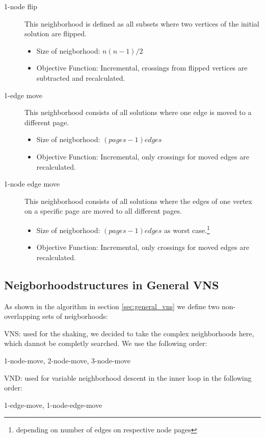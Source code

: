 \documentclass{scrartcl}
\begin{document}
\begin{description}
\item[1-node flip] 
    
    This neighborhood is defined as all subsets where two vertices of the initial solution are flipped.
    \begin{itemize}
        \item Size of neigborhood: $n(n-1)/2$
        \item Objective Function: Incremental, crossings from flipped vertices are subtracted and recalculated.

    \end{itemize}

	
\item[1-edge move] This neighborhood consists of all solutions where one edge is moved to a different page. 
     \begin{itemize}
        \item Size of neigborhood: $(pages-1) edges$ 
        \item Objective Function: Incremental, only crossings for moved edges are recalculated.
    \end{itemize}
   
	
\item[1-node edge move] This neighborhood consists of all solutions where the edges of
	one vertex on a specific page are moved to all different pages. 

    \begin{itemize}
        \item Size of neigborhood: $(pages-1) edges$ as worst case.\footnote{depending on number of edges on respective node pages}
        \item Objective Function: Incremental, only crossings for moved edges are recalculated.
    \end{itemize}
    

\end{description}



\subsection{Neigborhoodstructures in General VNS}
\label{neighborhood_orders}

As shown in the algorithm in section \ref{sec:general_vns} we define two non-overlapping sets of neigborhoods:

\begin{description}

    \item{VNS}: used for the shaking, we decided to take the complex neighborhoods here, which dannot be completly searched.
                We use the following order:
                
                1-node-move, 2-node-move, 3-node-move
                
    \item{VND}: used for variable neighborhood descent in the inner loop in the following order:
         
                1-edge-move, 1-node-edge-move

\end{description}
\end{document}
